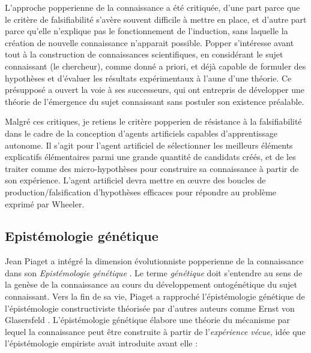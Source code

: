 L'approche popperienne de la connaissance a été critiquée, d'une part parce que le critère de falsifiabilité s'avère souvent difficile à mettre en place, et d'autre part parce qu'elle n'explique pas le fonctionnement de l'induction, sans laquelle la création de nouvelle connaissance n'apparait possible.
Popper s'intéresse avant tout à la construction de connaissances scientifiques, en considérant le sujet connaissant (le chercheur), comme donné a priori, et déjà capable de formuler des hypothèses et d'évaluer les résultats expérimentaux à l'aune d'une théorie. 
Ce présupposé a ouvert la voie à ses successeurs, qui ont entrepris de développer une théorie de l'émergence du sujet connaissant sans postuler son existence préalable. 

Malgré ces critiques, je retiens le critère popperien de résistance à la falsifiabilité dans le cadre de la conception d'agents artificiels capables d'apprentissage autonome.
Il s'agit pour l'agent artificiel de sélectionner les meilleurs éléments explicatifs élémentaires parmi une grande quantité de candidats créés, et de les traiter comme des micro-hypothèses pour construire sa connaissance à partir de son expérience.
L'agent artificiel devra mettre en œuvre des boucles de production/falsification d'hypothèses efficaces pour répondre au problème exprimé par Wheeler.


\subsection{Epistémologie génétique}
\label{sec:epistemologie_genetique}

\noindent
Jean Piaget a intégré la dimension évolutionniste popperienne de la connaissance dans son \emph{Epistémologie génétique} \cite{piaget_lepistemologie_1970}.
Le terme \emph{génétique} doit s'entendre au sens de la genèse de la connaissance au cours du développement ontogénétique du sujet connaissant.
Vers la fin de sa vie, Piaget a rapproché l'épistémologie génétique de l'épistémologie constructiviste théorisée par d'autres auteurs comme Ernst von Glasersfeld \cite{von_glasersfeld_radical_1995}. 
L'épistémologie génétique élabore une théorie du mécanisme par lequel la connaissance peut être construite à partir de l'\emph{expérience vécue}, idée que l'épistémologie empiriste avait introduite avant elle :


